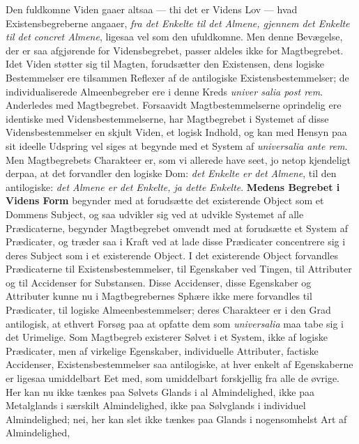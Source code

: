 \documentclass[11pt]{book}
\newcommand{\opage}[1]{\marginnote{\footnotesize\textit{[#1]}}}
\begin{document}
Den fuldkomne Viden gaaer altsaa --- thi det er Videns Lov --- hvad
Existensbegreberne angaaer, \emph{fra det Enkelte til det Almene,
gjennem det Enkelte til det concret Almene}, ligesaa vel som den
ufuldkomne. Men denne Bevægelse, der er saa afgjørende for
Vidensbegrebet, passer aldeles ikke for Magtbegrebet. Idet Viden
støtter sig til Magten, forudsætter den Existensen, dens logiske
Bestemmelser ere tilsammen Reflexer af de antilogiske
Existensbestemmelser; de individualiserede Almeenbegreber ere i denne
Kreds \textit{univer\-%
salia post rem}. Anderledes med Magtbegrebet. Forsaavidt
Magtbestemmelserne oprindelig ere identiske med Vidensbestemmelserne,
har Magtbegrebet i Systemet af disse Vidensbestemmelser en skjult
Viden, et logisk Indhold, og kan med Hensyn paa sit ideelle Udspring
vel siges at begynde med et System af \textit{universalia ante rem}.
Men Magtbegrebets Charakteer er, som vi allerede have seet, jo netop
kjendeligt derpaa, at det forvandler den logiske Dom: \emph{det Enkelte
er det Almene}, til den antilogiske: \emph{det Almene er det Enkelte,
ja dette Enkelte}. \textbf{Medens Begrebet i Videns Form} begynder med
at forudsætte det existerende Object som et Dommens Subject, og saa
udvikler sig ved at udvikle Systemet af alle Prædicaterne, begynder
Magtbegrebet omvendt med at forudsætte et System af Prædicater, og
træder saa i Kraft ved at lade disse Prædicater concentrere sig i deres
Subject som i et existerende Object. I det existerende Object
forvandles Prædicaterne til Existensbestemmelser, til Egenskaber ved
Tingen, til Attributer og til Accidenser for Substansen. Disse
Accidenser, disse Egenskaber og Attributer kunne nu i Magtbegrebernes
Sphære ikke mere forvandles til Prædicater, til logiske
Almeenbestemmelser; deres Charakteer er i den Grad antilogisk, at
ethvert Forsøg paa at opfatte dem som \textit{universalia} maa tabe sig
i det Urimelige. Som
\opage{204} \setcounter{footnote}{0}%
Magtbegreb existerer Sølvet i et System, ikke af logiske Prædicater,
men af virkelige Egenskaber, individuelle Attributer, factiske
Accidenser, Existensbestemmelser saa antilogiske, at hver enkelt af
Egenskaberne er ligesaa umiddelbart Eet med, som umiddelbart
forskjellig fra alle de øvrige. Her kan nu ikke tænkes paa Sølvets
Glands i al Almindelighed, ikke paa Metalglands i særskilt
Almindelighed, ikke paa Sølvglands i individuel Almindelighed; nei, her
kan slet ikke tænkes paa Glands i nogensomhelst Art af Almindelighed,
\end{document}
